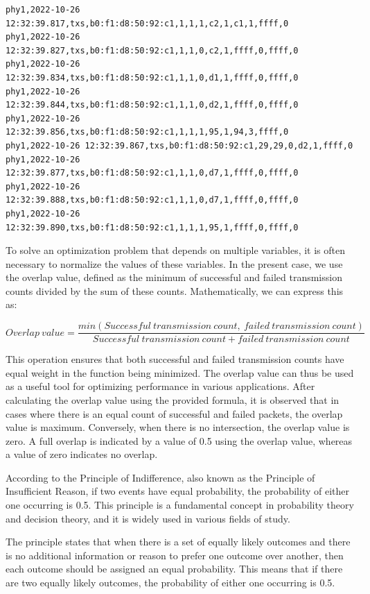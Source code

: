 \begin{lstlisting}[basicstyle=\small]
phy1,2022-10-26 12:32:39.817,txs,b0:f1:d8:50:92:c1,1,1,1,c2,1,c1,1,ffff,0
phy1,2022-10-26 12:32:39.827,txs,b0:f1:d8:50:92:c1,1,1,0,c2,1,ffff,0,ffff,0
phy1,2022-10-26 12:32:39.834,txs,b0:f1:d8:50:92:c1,1,1,0,d1,1,ffff,0,ffff,0
phy1,2022-10-26 12:32:39.844,txs,b0:f1:d8:50:92:c1,1,1,0,d2,1,ffff,0,ffff,0
phy1,2022-10-26 12:32:39.856,txs,b0:f1:d8:50:92:c1,1,1,1,95,1,94,3,ffff,0
phy1,2022-10-26 12:32:39.867,txs,b0:f1:d8:50:92:c1,29,29,0,d2,1,ffff,0
phy1,2022-10-26 12:32:39.877,txs,b0:f1:d8:50:92:c1,1,1,0,d7,1,ffff,0,ffff,0
phy1,2022-10-26 12:32:39.888,txs,b0:f1:d8:50:92:c1,1,1,0,d7,1,ffff,0,ffff,0
phy1,2022-10-26 12:32:39.890,txs,b0:f1:d8:50:92:c1,1,1,1,95,1,ffff,0,ffff,0
\end{lstlisting}
\vspace{0.5cm}

To solve an optimization problem that depends on multiple variables, it is often necessary to normalize the values of these variables. In the present case, we use the overlap value, defined as the minimum of successful and failed transmission counts divided by the sum of these counts. Mathematically, we can express this as:

\begin{equation}
Overlap\ value = \frac{min(Successful\ transmission\ count,\ failed\ transmission\ count)}{Successful\ transmission\ count + failed\ transmission\ count}
\end{equation}

This operation ensures that both successful and failed transmission counts have equal weight in the function being minimized. The overlap value can thus be used as a useful tool for optimizing performance in various applications.
\newpage
After calculating the overlap value using the provided formula, it is observed that in cases where there is an equal count of successful and failed packets, the overlap value is maximum. Conversely, when there is no intersection, the overlap value is zero. A full overlap is indicated by a value of 0.5 using the overlap value, whereas a value of zero indicates no overlap.

According to the Principle of Indifference, also known as the Principle of Insufficient Reason, if two events have equal probability, the probability of either one occurring is 0.5. This principle is a fundamental concept in probability theory and decision theory, and it is widely used in various fields of study.

The principle states that when there is a set of equally likely outcomes and there is no additional information or reason to prefer one outcome over another, then each outcome should be assigned an equal probability. This means that if there are two equally likely outcomes, the probability of either one occurring is 0.5.

